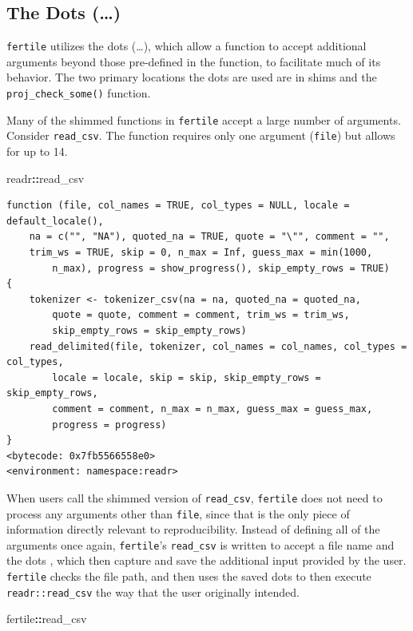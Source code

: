 \documentclass[12pt,twoside]{reedthesis}
\newenvironment{Shaded}{\begin{snugshade}}{\end{snugshade}}
\newcommand{\OperatorTok}[1]{\textcolor[rgb]{0.81,0.36,0.00}{\textbf{#1}}}
\newcommand{\NormalTok}[1]{#1}
\begin{document}
\subsection{The Dots (\ldots{})}\label{the-dots}

\texttt{fertile} utilizes the dots (\ldots{}), which allow a function to
accept additional arguments beyond those pre-defined in the function, to
facilitate much of its behavior. The two primary locations the dots are
used are in shims and the \texttt{proj\_check\_some()} function.

Many of the shimmed functions in \texttt{fertile} accept a large number
of arguments. Consider \texttt{read\_csv}. The function requires only
one argument (\texttt{file}) but allows for up to 14.
\begin{Shaded}
\begin{Highlighting}[]
\NormalTok{readr}\OperatorTok{::}\NormalTok{read_csv}
\end{Highlighting}
\end{Shaded}
\begin{verbatim}
function (file, col_names = TRUE, col_types = NULL, locale = default_locale(), 
    na = c("", "NA"), quoted_na = TRUE, quote = "\"", comment = "", 
    trim_ws = TRUE, skip = 0, n_max = Inf, guess_max = min(1000, 
        n_max), progress = show_progress(), skip_empty_rows = TRUE) 
{
    tokenizer <- tokenizer_csv(na = na, quoted_na = quoted_na, 
        quote = quote, comment = comment, trim_ws = trim_ws, 
        skip_empty_rows = skip_empty_rows)
    read_delimited(file, tokenizer, col_names = col_names, col_types = col_types, 
        locale = locale, skip = skip, skip_empty_rows = skip_empty_rows, 
        comment = comment, n_max = n_max, guess_max = guess_max, 
        progress = progress)
}
<bytecode: 0x7fb5566558e0>
<environment: namespace:readr>
\end{verbatim}
When users call the shimmed version of \texttt{read\_csv},
\texttt{fertile} does not need to process any arguments other than
\texttt{file}, since that is the only piece of information directly
relevant to reproducibility. Instead of defining all of the arguments
once again, \texttt{fertile}'s \texttt{read\_csv} is written to accept a
file name and the dots , which then capture and save the additional
input provided by the user. \texttt{fertile} checks the file path, and
then uses the saved dots to then execute \texttt{readr::read\_csv} the
way that the user originally intended.
\begin{Shaded}
\begin{Highlighting}[]
\NormalTok{fertile}\OperatorTok{::}\NormalTok{read_csv}
\end{Highlighting}
\end{Shaded}
\end{document}
